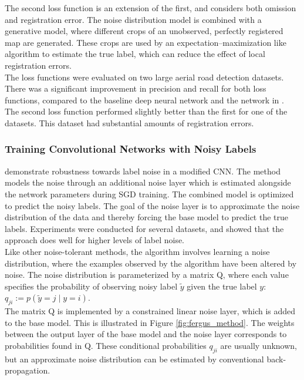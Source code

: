 The second loss function is an extension of the first, and considers both omission and registration error. The noise distribution model is combined with a generative model, where different crops of an unobserved, perfectly registered map are generated. These crops are used by an expectation–maximization like algorithm to estimate the true label, which can reduce the effect of local registration errors.\\


The loss functions were evaluated on two large aerial road detection datasets. There was a significant improvement in precision and recall for both loss functions, compared to the baseline deep neural network and the network in \citep{Mnih_roads_high_res_aerial_images}. The second loss function performed slightly better than the first for one of the datasets. This dataset had substantial amounts of registration errors.\\


\subsubsection{Training Convolutional Networks with Noisy Labels}
\cite{Sukhbaatar_noisy_network_learning} demonstrate robustness towards label noise in a modified \ac{CNN}. The method models the noise through an additional noise layer which is estimated alongside the network parameters during \ac{SGD} training. The combined model is optimized to predict the noisy labels. The goal of the noise layer is to approximate the noise distribution of the data and thereby forcing the base model to predict the true labels. Experiments were conducted for several datasets, and showed that the approach does well for higher levels of label noise. \\

Like other noise-tolerant methods, the algorithm involves learning a noise distribution, where the examples observed by the algorithm have been altered by noise. The noise distribution is parameterized by a matrix Q, where each value specifies the probability of observing noisy label $\tilde{y}$ given the true label $y$: $q_{ji} := p(\tilde{y} = j \mid y = i)$. \\

The matrix Q is implemented by a constrained linear noise layer, which is added to the base model. This is illustrated in Figure \ref{fig:fergus_method}. The weights between the output layer of the base model and the noise layer corresponds to probabilities found in Q. These conditional probabilities $q_{ji}$ are usually unknown, but an approximate noise distribution can be estimated by conventional back-propagation. \\

